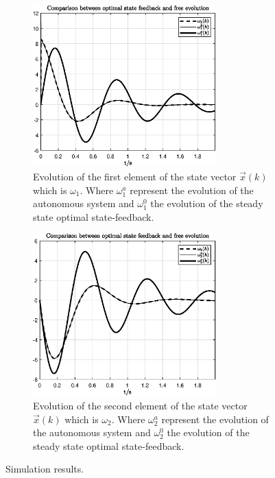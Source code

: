 \documentclass[11pt,a4paper,oneside]{book}
\numberwithin{equation}{section}
\theoremstyle{it}
\theoremstyle{definition}
\begin{document}
\begin{figure}[H]
	\centering
	\begin{subfigure}{.5\textwidth}
		\centering
		\includegraphics[width = 200pt, 
		keepaspectratio]{figures/optimal_control/state12.eps}
		\captionsetup{width=0.65\textwidth, font=footnotesize}
		\caption{Evolution of the first element of the state vector 
			$\vec{x}(k)$ which is $\omega_1$. Where $\omega_1^a$ represent the 
			evolution of the autonomous system and $\omega_1^0$ the evolution of 
			the steady state optimal state-feedback.}
		\label{figure_msm_opt_state_f_1}
	\end{subfigure}%
	\begin{subfigure}{.5\textwidth}
		\centering
		\includegraphics[width = 200pt, 
		keepaspectratio]{figures/optimal_control/state22.eps}
		\captionsetup{width=0.65\textwidth, font=footnotesize}
		\caption{Evolution of the second element of the state vector 
			$\vec{x}(k)$ which is $\omega_2$. Where $\omega_2^a$ represent the 
			evolution of the autonomous system and $\omega_2^0$ the evolution of 
			the steady state optimal state-feedback.}
		\label{figure_msm_opt_state_f_2}
	\end{subfigure}
	\captionsetup{width=0.65\textwidth, font=small}
	\caption{Simulation results.}
	\label{}
\end{figure}
\end{document}
